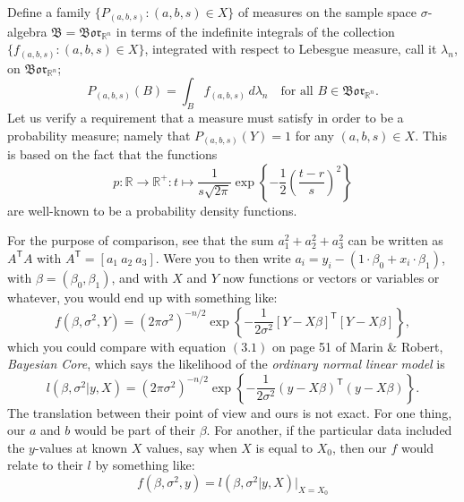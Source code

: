\documentclass[
twoside=true,
paper=letter,
fontsize=11pt,
pagesize=auto,
leqno,
openany,
headsepline,
overfullrule,
]{scrbook}
\theoremstyle{plain}
\theoremstyle{plain}
\theoremstyle{definition}
\theoremstyle{bfnoteitalic}
\theoremstyle{bfnoteroman}
\newcommand{\sigalg}[1]{\mathfrak{#1}}
\newcommand{\borel}{\mathfrak{Bor}}
\newcommand{\textsigma}{\hbox{\large{$\sigma$}}\kern-1pt}
\newcommand{\R}{\mathbb{R}}
\newcommand{\function}{f}
\newcommand{\measurespace}{X}
\newcommand{\measurespaceii}{Y}
\newcommand{\setii}{B}
\newcommand{\pspace}{\measurespace}%
\newcommand{\sspace}{\measurespaceii}%
\newcommand{\sspacesig}{\sigalg{B}}
\begin{document}
Define a family $\{P_{(a,b,s)}:(a,b,s)\in\pspace\}$ of measures on the sample space \textsigma-algebra
$\sspacesig=\borel_{\R^n}$ in terms of the indefinite integrals of the collection
$\{ \function_{(a,b,s)} : (a,b,s)\in\pspace \}$, integrated with respect to Lebesgue measure, call it
$\lambda_{n}$, on
$\borel_{\R^n}$;
\[
P_{(a,b,s)}(\setii)=
\int_\setii \function_{(a,b,s)} \,d\lambda_{n}
\quad
\text{for all $\setii\in\borel_{\R^n}$}.
\]
Let us verify a requirement that a measure must satisfy in order to be a probability measure; namely that
$P_{(a,b,s)}(\sspace)=1$ for any $(a,b,s)\in\pspace$.
This is based on the fact that the functions
\[
p:\R\to\R^+
:t \mapsto
\frac{1}{s\sqrt{2\pi}}
\exp
\left\{
-\frac{1}{2}
\left(
\frac{t-r}{s}
\right)^2
\right\}
\]
are well-known to be a probability density functions.

\begin{quoting}\small
For the purpose of comparison, see that the sum
$a_1^2+a_2^2+a_3^2$ can be written as $A^{\textsf{T}}A$ with
$A^{\textsf{T}} = [a_1\ a_2\ a_3]$.
Were you to then write $a_i=y_i-(1\cdot\beta_0+x_i\cdot\beta_1)$, with $\beta=(\beta_0,\beta_1)$,  and with $X$ and $Y$ now functions or vectors or variables or whatever, you would end up with something like:
\[
\function(\beta,\sigma^2,Y)=
\left(2\pi\sigma^2\right)^{-n/2}
\exp\left\{
-\frac{1}{2\sigma^2}[Y-X\beta]^{\textsf{T}}[Y-X\beta]
\right\},
\]
which you could compare with equation $(3.1)$ on page 51 of Marin \& Robert, \textsl{Bayesian Core}, which says the likelihood of the \emph{ordinary normal linear model} is
\[
l(\beta,\sigma^2\vert y,X) 
=
\left(2\pi\sigma^2\right)^{-n/2}
\exp\left\{
-\frac{1}{2\sigma^2}(y-X\beta)^{\textsf{T}}(y-X\beta)
\right\}.
\]
The translation between their point of view and ours is not exact. For one thing,  our $a$ and $b$ would be part of their $\beta$.
For another, if the particular data included the $y$-values at known $X$ values, say when $X$ is equal to $X_0$, then our $f$ would relate to their $l$ by something like:
\[
f(\beta,\sigma^2,y)
=
l(\beta,\sigma^2\vert y,X)\Big|_{X=X_0}
\]
\end{quoting}
\end{document}
